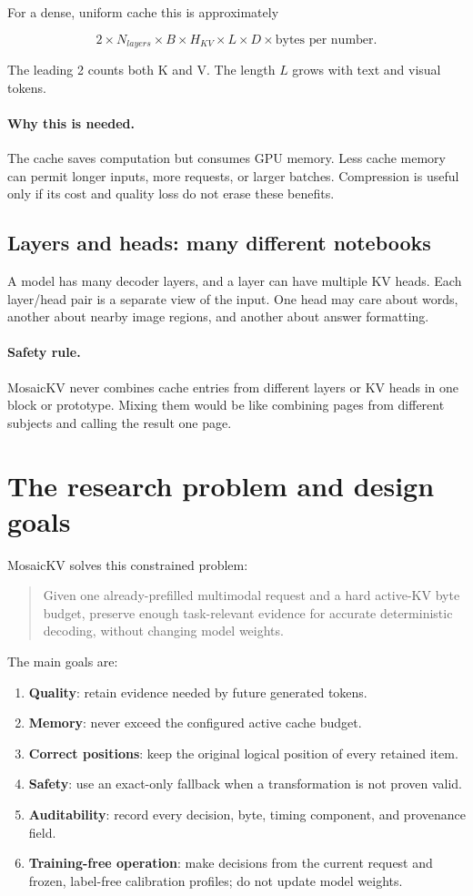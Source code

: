 \documentclass[11pt]{article}
\newcommand{\term}[1]{\textbf{#1}}
\newcommand{\why}{\paragraph{Why this is needed.}}
\newcommand{\safety}{\paragraph{Safety rule.}}
\begin{document}
For a dense, uniform cache this is approximately

\begin{equation}
  2 \times N_{layers} \times B \times H_{KV} \times L \times D
  \times \text{bytes per number}.
\end{equation}

The leading 2 counts both K and V. The length $L$ grows with text and visual tokens.

\why The cache saves computation but consumes GPU memory. Less cache memory can permit longer
inputs, more requests, or larger batches. Compression is useful only if its cost and quality loss
do not erase these benefits.

\subsection{Layers and heads: many different notebooks}

A model has many decoder layers, and a layer can have multiple KV heads. Each layer/head pair is
a separate view of the input. One head may care about words, another about nearby image regions,
and another about answer formatting.

\safety MosaicKV never combines cache entries from different layers or KV heads in one block or
prototype. Mixing them would be like combining pages from different subjects and calling the
result one page.

\section{The research problem and design goals}

MosaicKV solves this constrained problem:

\begin{quote}
Given one already-prefilled multimodal request and a hard active-KV byte budget, preserve enough
task-relevant evidence for accurate deterministic decoding, without changing model weights.
\end{quote}

The main goals are:

\begin{enumerate}
  \item \term{Quality}: retain evidence needed by future generated tokens.
  \item \term{Memory}: never exceed the configured active cache budget.
  \item \term{Correct positions}: keep the original logical position of every retained item.
  \item \term{Safety}: use an exact-only fallback when a transformation is not proven valid.
  \item \term{Auditability}: record every decision, byte, timing component, and provenance field.
  \item \term{Training-free operation}: make decisions from the current request and frozen,
        label-free calibration profiles; do not update model weights.
\end{enumerate}
\end{document}
